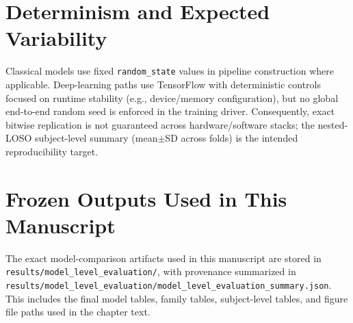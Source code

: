 \section{Determinism and Expected Variability}
\label{sec:reproducibility_determinism}
Classical models use fixed \texttt{random\_state} values in pipeline construction where applicable. Deep-learning paths use TensorFlow with deterministic controls focused on runtime stability (e.g., device/memory configuration), but no global end-to-end random seed is enforced in the training driver. Consequently, exact bitwise replication is not guaranteed across hardware/software stacks; the nested-LOSO subject-level summary (mean\(\pm\)SD across folds) is the intended reproducibility target.

\section{Frozen Outputs Used in This Manuscript}
\label{sec:reproducibility_frozen_outputs}
The exact model-comparison artifacts used in this manuscript are stored in \texttt{results/model\_level\_evaluation/}, with provenance summarized in \texttt{results/model\_level\_evaluation/model\_level\_evaluation\_summary.json}. This includes the final model tables, family tables, subject-level tables, and figure file paths used in the chapter text.
